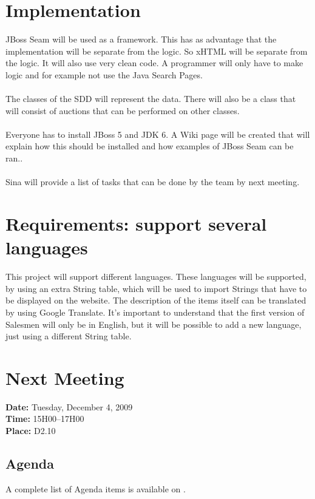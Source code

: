 \documentclass[a4paper, 12pt]{article}
\begin{document}
	\section{Implementation}
JBoss Seam will be used as a framework. This has as advantage that the implementation will be separate from the logic. So xHTML will be separate from the logic. It will also use very clean code. A programmer will only have to make logic and for example not use the Java Search Pages. \\ \\
The classes of the SDD will represent the data. There will also be a class that will consist of auctions that can be performed on other classes. \\ \\
Everyone has to install JBoss 5 and JDK 6. A Wiki page will be created that will explain how this should be installed and how examples of JBoss Seam can be ran.\cite{site2}. \\ \\
Sina will provide a list of tasks that can be done by the team by next meeting.

	\section{Requirements: support several languages}
This project will support different languages. These languages will be supported, by using an extra String table, which will be used to import Strings that have to be displayed on the website. The description of the items itself can be translated by using Google Translate. It's important to understand that the first version of Salesmen will only be in English, but it will be possible to add a new language, just using a different String table.
	
	\section{Next Meeting}

		\textbf{Date:} Tuesday, December 4, 2009\\
		\textbf{Time:} 15H00--17H00\\
		\textbf{Place:} D2.10\\
	
		\subsection{Agenda}
A complete list of Agenda items is available on \cite{site6}.\\
	
\end{document}
